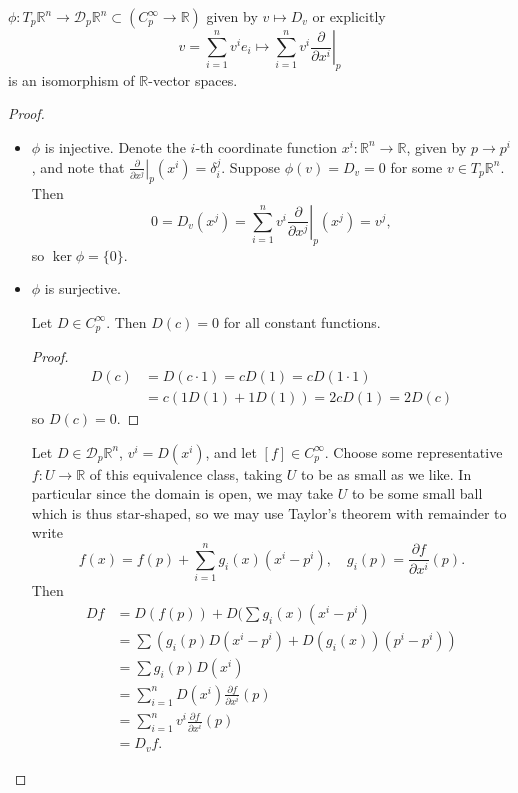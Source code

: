 \begin{theorem}
$\phi : T_p \mathbb{R}^n \to \mathcal{D}_p \mathbb{R}^n \subset
(C_p^\infty \to \mathbb{R})$ given by
$v \mapsto D_v$ or explicitly
$$
  v
= \sum_{i=1}^n v^i e_i
\mapsto
  \sum_{i=1}^n v^i \left.\frac{\partial}{\partial x^i}\right|_p
$$
 is an isomorphism of $\mathbb{R}$-vector spaces.
\end{theorem}

\begin{proof}

\begin{itemize}
  \item{
    $\phi$ is injective.
    Denote the $i$-th coordinate function
    $x^i : \mathbb{R}^n \to \mathbb{R}$, given by $p \to p^i$, and note
    that
    $\left.\frac{\partial}{\partial x^j}\right|_p (x^i) = \delta_i^j$.
    Suppose $\phi(v) = D_v = 0$ for some $v \in T_p \mathbb{R}^n$. Then
    $$
      0
    = D_v (x^j)
    = \sum_{i=1}^n
        v^i
        \left.
          \frac{\partial}
               {\partial x^j}
        \right|_p
          (x^j)
    = v^j,
    $$
    so $\ker \phi = \{ 0 \}$.
  }
  \item{
    $\phi$ is surjective.

    \begin{lemma}
      Let $D \in C_p^\infty$. Then $D(c) = 0$ for all constant
      functions.
    \end{lemma}
    \begin{proof}
      \begin{align*}
           D(c)
        &= D(c \cdot 1)
         = c D(1)
         = c D(1 \cdot 1) \\
        &= c (1 D(1) + 1 D(1))
         = 2 c D(1)
         = 2 D(c)
      \end{align*}
      so $D(c) = 0$.
    \end{proof}

    Let $D \in \mathcal{D}_p \mathbb{R}^n$, $v^i = D(x^i)$, and let
    $[f] \in C_p^\infty$. Choose some representative
    $f : U \to \mathbb{R}$ of this equivalence class, taking $U$ to be
    as small as we like. In particular since the domain is open, we
    may take $U$ to be some small ball which is thus star-shaped, so
    we may use Taylor's theorem with remainder to write
    $$
      f(x)
    = f(p)
    + \sum_{i=1}^n
        g_i(x)
        (x^i - p^i), \quad
      g_i(p)
    = \frac{\partial f}{\partial x^i}(p).
    $$
    Then
    \begin{align*}
       D f
    &= D(f(p))
     + D(\sum g_i (x) (x^i - p^i) \\
    &= \sum
         \left(
           g_i(p) D(x^i - p^i)
         + D(g_i(x))(p^i - p^i)
         \right) \\
    &= \sum
         g_i(p) D(x^i) \\
    &= \sum_{i=1}^n
         D(x^i)
         \frac{\partial f}
              {\partial x^i}(p) \\
    &= \sum_{i=1}^n
         v^i
         \frac{\partial f}
              {\partial x^i}(p) \\
    &= D_v f.
    \end{align*}
  }
\end{itemize}
\end{proof}


